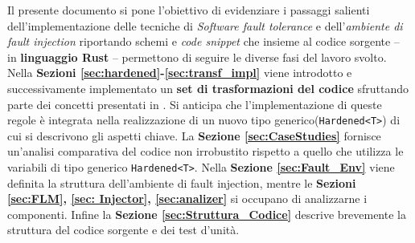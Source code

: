 \noindent 
Il presente documento si pone l'obiettivo di evidenziare i passaggi salienti dell'implementazione delle tecniche di \textit{Software fault tolerance} e dell'\textit{ambiente di fault injection} riportando schemi e \textit{code snippet}  che insieme al codice sorgente -- in \textbf{linguaggio Rust} -- permettono di seguire le diverse fasi del lavoro svolto.\\
Nella \textbf{Sezioni \ref{sec:hardened}-\ref{sec:transf_impl}} viene introdotto e successivamente implementato un \textbf{set di trasformazioni del codice} sfruttando parte dei concetti presentati in \cite{rebaudengo1999soft}. Si anticipa che l'implementazione di queste regole è integrata nella realizzazione di un nuovo tipo generico(\texttt{Hardened<T>}) di cui si descrivono gli aspetti chiave. La \textbf{Sezione \ref{sec:CaseStudies}} fornisce un'analisi comparativa del codice non irrobustito rispetto a quello che utilizza le variabili di tipo generico \texttt{Hardened<T>}. Nella \textbf{Sezione \ref{sec:Fault_Env}} viene definita la struttura dell'ambiente di fault injection, mentre le \textbf{Sezioni \ref{sec:FLM}, \ref{sec: Injector}, \ref{sec:analizer}} si occupano di analizzarne i componenti. Infine la \textbf{Sezione \ref{sec:Struttura_Codice}} descrive brevemente la struttura del codice sorgente e dei test d'unità.
